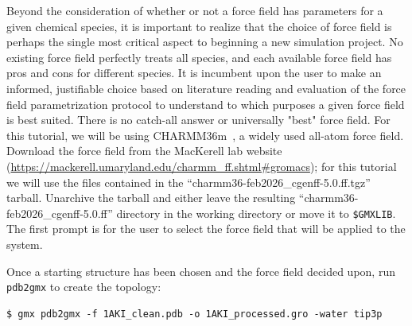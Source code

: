 \documentclass[9pt,tutorial,pubversion]{livecoms}
\begin{document}
Beyond the consideration of whether or not a force field has parameters for a given chemical species, it is important to realize that the choice of force field is perhaps the single most critical aspect to beginning a new simulation project. No existing force field perfectly treats all species, and each available force field has pros and cons for different species. It is incumbent upon the user to make an informed, justifiable choice based on literature reading and evaluation of the force field parametrization protocol to understand to which purposes a given force field is best suited. There is no catch-all answer or universally "best" force field. For this tutorial, we will be using CHARMM36m~\cite{Huang2016}, a widely used all-atom force field. Download the force field from the MacKerell lab website (\url{https://mackerell.umaryland.edu/charmm_ff.shtml#gromacs}); for this tutorial we will use the files contained in the ``charmm36-feb2026\_cgenff-5.0.ff.tgz'' tarball. Unarchive the tarball and either leave the resulting ``charmm36-feb2026\_cgenff-5.0.ff'' directory in the working directory or move it to \texttt{\$GMXLIB}. The first prompt is for the user to select the force field that will be applied to the system. 

Once a starting structure has been chosen and the force field decided upon, run \texttt{pdb2gmx} to create the topology:

\begin{lstlisting}
$ gmx pdb2gmx -f 1AKI_clean.pdb -o 1AKI_processed.gro -water tip3p
\end{lstlisting}
%
\end{document}
